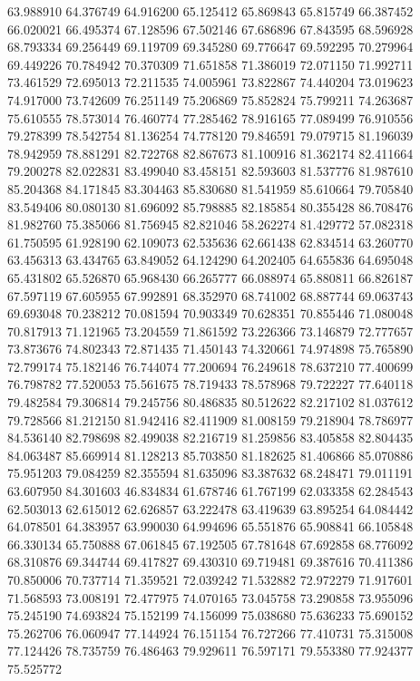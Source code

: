 63.988910
64.376749
64.916200
65.125412
65.869843
65.815749
66.387452
66.020021
66.495374
67.128596
67.502146
67.686896
67.843595
68.596928
68.793334
69.256449
69.119709
69.345280
69.776647
69.592295
70.279964
69.449226
70.784942
70.370309
71.651858
71.386019
72.071150
71.992711
73.461529
72.695013
72.211535
74.005961
73.822867
74.440204
73.019623
74.917000
73.742609
76.251149
75.206869
75.852824
75.799211
74.263687
75.610555
78.573014
76.460774
77.285462
78.916165
77.089499
76.910556
79.278399
78.542754
81.136254
74.778120
79.846591
79.079715
81.196039
78.942959
78.881291
82.722768
82.867673
81.100916
81.362174
82.411664
79.200278
82.022831
83.499040
83.458151
82.593603
81.537776
81.987610
85.204368
84.171845
83.304463
85.830680
81.541959
85.610664
79.705840
83.549406
80.080130
81.696092
85.798885
82.185854
80.355428
86.708476
81.982760
75.385066
81.756945
82.821046
58.262274
81.429772
57.082318
61.750595
61.928190
62.109073
62.535636
62.661438
62.834514
63.260770
63.456313
63.434765
63.849052
64.124290
64.202405
64.655836
64.695048
65.431802
65.526870
65.968430
66.265777
66.088974
65.880811
66.826187
67.597119
67.605955
67.992891
68.352970
68.741002
68.887744
69.063743
69.693048
70.238212
70.081594
70.903349
70.628351
70.855446
71.080048
70.817913
71.121965
73.204559
71.861592
73.226366
73.146879
72.777657
73.873676
74.802343
72.871435
71.450143
74.320661
74.974898
75.765890
72.799174
75.182146
76.744074
77.200694
76.249618
78.637210
77.400699
76.798782
77.520053
75.561675
78.719433
78.578968
79.722227
77.640118
79.482584
79.306814
79.245756
80.486835
80.512622
82.217102
81.037612
79.728566
81.212150
81.942416
82.411909
81.008159
79.218904
78.786977
84.536140
82.798698
82.499038
82.216719
81.259856
83.405858
82.804435
84.063487
85.669914
81.128213
85.703850
81.182625
81.406866
85.070886
75.951203
79.084259
82.355594
81.635096
83.387632
68.248471
79.011191
63.607950
84.301603
46.834834
61.678746
61.767199
62.033358
62.284543
62.503013
62.615012
62.626857
63.222478
63.419639
63.895254
64.084442
64.078501
64.383957
63.990030
64.994696
65.551876
65.908841
66.105848
66.330134
65.750888
67.061845
67.192505
67.781648
67.692858
68.776092
68.310876
69.344744
69.417827
69.430310
69.719481
69.387616
70.411386
70.850006
70.737714
71.359521
72.039242
71.532882
72.972279
71.917601
71.568593
73.008191
72.477975
74.070165
73.045758
73.290858
73.955096
75.245190
74.693824
75.152199
74.156099
75.038680
75.636233
75.690152
75.262706
76.060947
77.144924
76.151154
76.727266
77.410731
75.315008
77.124426
78.735759
76.486463
79.929611
76.597171
79.553380
77.924377
75.525772

